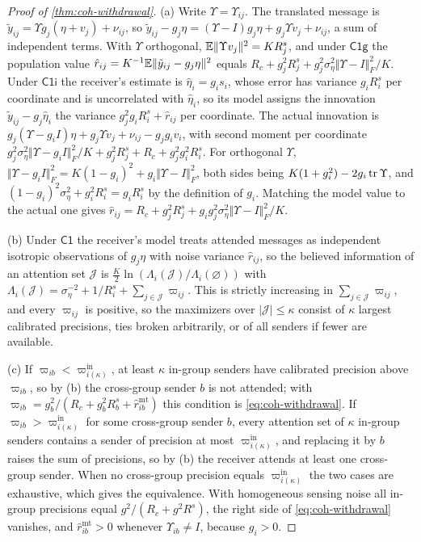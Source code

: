 \begin{proof}[Proof of \cref{thm:coh-withdrawal}]
(a) Write $\Upsilon=\Upsilon_{ij}$. The translated message is $\tilde y_{ij}=\Upsilon g_j(\eta+v_j)+\nu_{ij}$, so $\tilde y_{ij}-g_j\eta=(\Upsilon-I)g_j\eta+g_j\Upsilon v_j+\nu_{ij}$, a sum of independent terms. With $\Upsilon$ orthogonal, $\mathbb{E}\Vert\Upsilon v_j\Vert^2=KR^s_j$, and under $\mathsf{C1g}$ the population value $\hat r_{ij}=K^{-1}\mathbb{E}\Vert\tilde y_{ij}-g_j\eta\Vert^2$ equals $R_c+g_j^2R^s_j+g_j^2\sigma_\eta^2\Vert\Upsilon-I\Vert_F^2/K$. Under $\mathsf{C1i}$ the receiver's estimate is $\hat\eta_i=g_is_i$, whose error has variance $g_iR^s_i$ per coordinate and is uncorrelated with $\hat\eta_i$, so its model assigns the innovation $\tilde y_{ij}-g_j\hat\eta_i$ the variance $g_j^2g_iR^s_i+\hat r_{ij}$ per coordinate. The actual innovation is $g_j(\Upsilon-g_iI)\eta+g_j\Upsilon v_j+\nu_{ij}-g_jg_iv_i$, with second moment per coordinate $g_j^2\sigma_\eta^2\Vert\Upsilon-g_iI\Vert_F^2/K+g_j^2R^s_j+R_c+g_j^2g_i^2R^s_i$. For orthogonal $\Upsilon$, $\Vert\Upsilon-g_iI\Vert_F^2=K(1-g_i)^2+g_i\Vert\Upsilon-I\Vert_F^2$, both sides being $K(1+g_i^2)-2g_i\operatorname{tr}\Upsilon$, and $(1-g_i)^2\sigma_\eta^2+g_i^2R^s_i=g_iR^s_i$ by the definition of $g_i$. Matching the model value to the actual one gives $\hat r_{ij}=R_c+g_j^2R^s_j+g_ig_j^2\sigma_\eta^2\Vert\Upsilon-I\Vert_F^2/K$.

(b) Under $\mathsf{C1}$ the receiver's model treats attended messages as independent isotropic observations of $g_j\eta$ with noise variance $\hat r_{ij}$, so the believed information of an attention set $\mathcal J$ is $\frac K2\ln(\Lambda_i(\mathcal J)/\Lambda_i(\varnothing))$ with $\Lambda_i(\mathcal J)=\sigma_\eta^{-2}+1/R^s_i+\sum_{j\in\mathcal J}\varpi_{ij}$. This is strictly increasing in $\sum_{j\in\mathcal J}\varpi_{ij}$, and every $\varpi_{ij}$ is positive, so the maximizers over $|\mathcal J|\le\kappa$ consist of $\kappa$ largest calibrated precisions, ties broken arbitrarily, or of all senders if fewer are available.

(c) If $\varpi_{ib}<\varpi^{\mathrm{in}}_{i(\kappa)}$, at least $\kappa$ in-group senders have calibrated precision above $\varpi_{ib}$, so by (b) the cross-group sender $b$ is not attended; with $\varpi_{ib}=g_b^2/(R_c+g_b^2R^s_b+\hat r^{\mathrm{mt}}_{ib})$ this condition is \eqref{eq:coh-withdrawal}. If $\varpi_{ib}>\varpi^{\mathrm{in}}_{i(\kappa)}$ for some cross-group sender $b$, every attention set of $\kappa$ in-group senders contains a sender of precision at most $\varpi^{\mathrm{in}}_{i(\kappa)}$, and replacing it by $b$ raises the sum of precisions, so by (b) the receiver attends at least one cross-group sender. When no cross-group precision equals $\varpi^{\mathrm{in}}_{i(\kappa)}$ the two cases are exhaustive, which gives the equivalence. With homogeneous sensing noise all in-group precisions equal $g^2/(R_c+g^2R^s)$, the right side of \eqref{eq:coh-withdrawal} vanishes, and $\hat r^{\mathrm{mt}}_{ib}>0$ whenever $\Upsilon_{ib}\ne I$, because $g_i>0$.
\end{proof}


